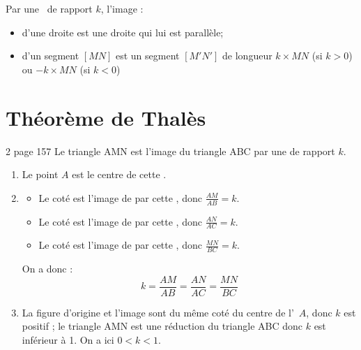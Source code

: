 \documentclass[12pt,a4paper]{article}
\begin{document}
\begin{myprops}
	Par une \homo\ de rapport $k$, l'image :
	\begin{itemize}
		\item d'une droite est une droite qui lui est parallèle;
		\item d'un segment $[MN]$ est un segment $[M'N']$ de longueur $k \times MN$ (si $k>0$) ou $-k \times MN$ (si $k<0$)
	\end{itemize}
\end{myprops}

\section{Théorème de Thalès}

\begin{myact}{2 page 157}
	Le triangle AMN est l'image du triangle ABC par une \homo de rapport $k$.
	\begin{enumerate}[label=\alph*.]
		\item Le point $A$ est le centre de cette \homo .
		\item \begin{itemize}
			\item Le coté  est l'image de  par cette \homo , donc $\frac{AM}{AB}=k$.  
			\item Le coté  est l'image de  par cette \homo , donc $\frac{AN}{AC}=k$.
			\item Le coté  est l'image de  par cette \homo , donc $\frac{MN}{BC}=k$.
		\end{itemize}
		
		On a donc : \begin{equation*}
			k=\dfrac{AM}{AB}=\dfrac{AN}{AC}=\dfrac{MN}{BC}
		\end{equation*}
		
		\item La figure d'origine et l'image sont du même coté du centre de l'\homo\ $A$, donc $k$ est positif ; le triangle AMN est une réduction du triangle ABC donc $k$ est inférieur à 1. On a ici $0<k<1$. 
	\end{enumerate}
\end{myact}
\end{document}
